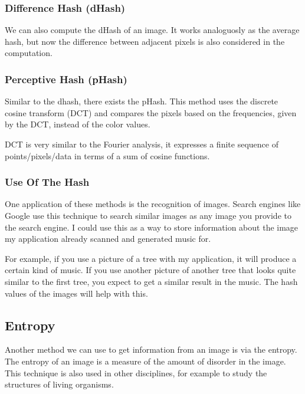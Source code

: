 \documentclass[12pt]{article}
\begin{document}
\subsubsection{Difference Hash (dHash)}
We can also compute the dHash of an image. It works analoguosly as the average hash, but now the difference between adjacent pixels is also considered in the computation.

\subsubsection{Perceptive Hash (pHash)}
Similar to the dhash, there exists the pHash. This method uses the discrete cosine transform (DCT) and compares the pixels based on the frequencies, given by the DCT, instead of the color values.

DCT is very similar to the Fourier analysis, it expresses a finite sequence of points/pixels/data in terms of a sum of cosine functions.

\subsubsection{Use Of The Hash}
One application of these methods is the recognition of images. Search engines like Google use this technique to search similar images as any image you provide to the search engine. I could use this as a way to store information about the image my application already scanned and generated music for.

For example, if you use a picture of a tree with my application, it will produce a certain kind of music. If you use another picture of another tree that looks quite similar to the first tree, you expect to get a similar result in the music. The hash values of the images will help with this. 

\subsection{Entropy}

Another method we can use to get information from an image is via the entropy.
The entropy of an image is a measure of the amount of disorder in the image. This technique is also used in other disciplines, for example to study the structures of living organisms.
\end{document}
